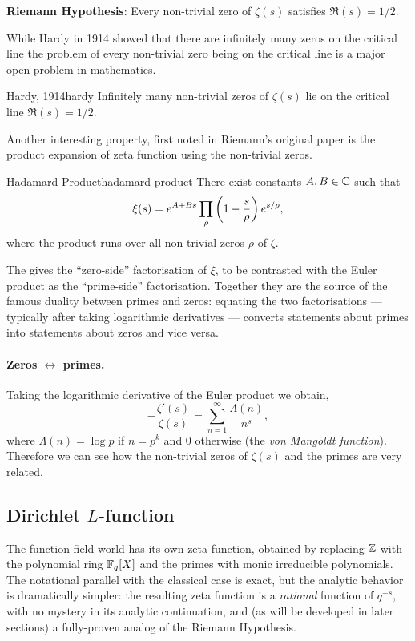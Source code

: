 \begin{Theoremcon}
  \textcolor{mytheoremfr}{\textbf{Riemann Hypothesis}:} Every non-trivial zero of $\zeta(s)$ satisfies $\Re(s)=1/2$.
\end{Theoremcon}

While Hardy in 1914 showed that there are infinitely many zeros on the critical line the problem of every non-trivial zero being on the critical line is a major open problem in mathematics.
\begin{Theorem}{Hardy, 1914}{hardy}
  Infinitely many non-trivial zeros of $\zeta(s)$ lie on the critical line $\Re(s)=1/2$.
\end{Theorem}

Another interesting property, first noted in Riemann's original paper is the product expansion of zeta function using the non-trivial zeros.
\begin{Theorem}{Hadamard Product}{hadamard-product}%
  There exist constants $A,B\in\mathbb{C}$ such that
  $$\xi(s)=e^{A+Bs}\prod_{\rho}\left(1-\frac{s}{\rho}\right)e^{s/\rho},$$
  where the product runs over all non-trivial zeros $\rho$ of $\zeta$.
\end{Theorem}

\begin{note}
  The \HadamardProdthm gives the ``zero-side'' factorisation of $\xi$, to be contrasted with the Euler product as the ``prime-side'' factorisation. Together they are the source of the famous duality between primes and zeros: equating the two factorisations --- typically after taking logarithmic derivatives --- converts statements about primes into statements about zeros and vice versa.
\end{note}

\paragraph{Zeros \texorpdfstring{$\leftrightarrow$}{<->} primes.} Taking the logarithmic derivative of the Euler product we obtain,
$$-\frac{\zeta'(s)}{\zeta(s)}=\sum_{n=1}^{\infty}\frac{\Lambda(n)}{n^s},$$
where $\Lambda(n)=\log p$ if $n=p^k$ and $0$ otherwise (the \emph{von Mangoldt function}). Therefore we can see how the non-trivial zeros of $\zeta(s)$ and the primes are very related.


\subsection{Dirichlet \texorpdfstring{$L$}{L}-function}%
%
The function-field world has its own zeta function, obtained by replacing $\mathbb{Z}$ with the polynomial ring $\mathbb{F}_q[X]$ and the primes with monic irreducible polynomials. The notational parallel with the classical case is exact, but the analytic behavior is dramatically simpler: the resulting zeta function is a \emph{rational} function of $q^{-s}$, with no mystery in its analytic continuation, and (as will be developed in later sections) a fully-proven analog of the Riemann Hypothesis.

